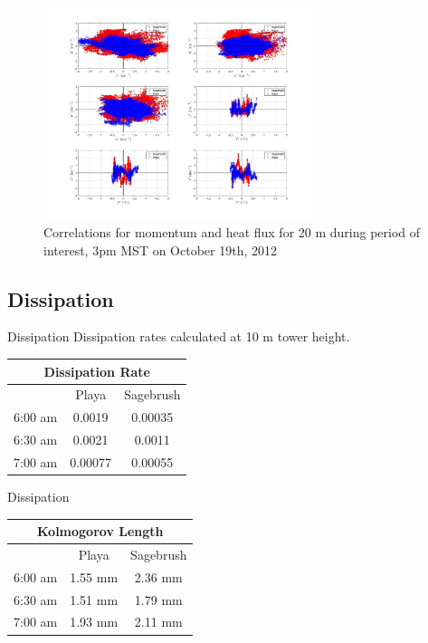 \documentclass{beamer}
\begin{document}
\begin{frame}
	\begin{figure}[t!]
		\centering
		\includegraphics[width=0.7\textwidth]{plots/momentum_corr_20m}
		\caption{Correlations for momentum and heat flux for 20 m during period of interest, 3pm MST on October 19th, 2012}
	\end{figure}
	
\end{frame}

\subsection{Dissipation}
\begin{frame}{Dissipation}
Dissipation rates calculated at 10 m tower height.
\begin{table}
\centering
\begin{tabular}{|c|c|c|}
	\hline
	\multicolumn{3}{|c|}{Dissipation Rate} \\
	\hline
	& Playa & Sagebrush \\
	\hline
	6:00 am & 0.0019 & 0.00035 \\
	6:30 am & 0.0021 & 0.0011 \\
	7:00 am & 0.00077 & 0.00055 \\
	\hline
\end{tabular}%
\end{table}
\end{frame}

\begin{frame}{Dissipation}
\begin{table}
\centering
\begin{tabular}{|c|c|c|}
	\hline
	\multicolumn{3}{|c|}{Kolmogorov Length} \\
	\hline
	& Playa & Sagebrush \\
	\hline
	6:00 am & 1.55 mm & 2.36 mm\\
	6:30 am & 1.51 mm & 1.79 mm\\
	7:00 am & 1.93 mm & 2.11 mm\\
	\hline
\end{tabular}%
\end{table}
\end{frame}
\end{document}

